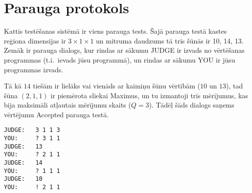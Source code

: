 \section*{Parauga protokols}
Kattis testēšanas sistēmā ir viens parauga tests.
Šajā parauga testā kastes reģiona dimensijas ir $3\times 1\times 1$ un mitruma daudzums tā trīs šūnās ir {10, 14, 13}.
Zemāk ir parauga dialogs, kur rindas ar sākumu JUDGE ir izvads no vērtēšanas programmas (t.i.\ ievads jūsu programmā), un rindas ar sākumu YOU ir jūsu programmas izvads.

Tā kā $14$ tiešām ir lielāks vai vienāds ar kaimiņu šūnu vērtībām ($10$ un $13$), tad šūna $(2,1,1)$ ir piemērota sliekai Maximus,
un tu izmantoji trīs mērījumus, kas bija maksimāli atļautais mērījumu skaits ($Q=3$). Tādēļ šāds dialogs saņems vērtējumu Accepted parauga testā.

\begin{verbatim}
JUDGE:   3 1 1 3
YOU:     ? 3 1 1
JUDGE:   13
YOU:     ? 2 1 1
JUDGE:   14
YOU:     ? 1 1 1
JUDGE:   10
YOU:     ! 2 1 1
\end{verbatim}
